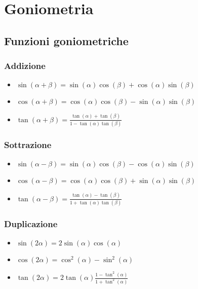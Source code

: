 
\section{Goniometria}

\subsection{Funzioni goniometriche}

\subsubsection*{Addizione}

\begin{itemize}
    \item $\sin(\alpha+\beta)=\sin(\alpha)\cos(\beta)+\cos(\alpha)\sin(\beta)$
    \item $\cos(\alpha+\beta)=\cos(\alpha)\cos(\beta)-\sin(\alpha)\sin(\beta)$
    \item $\tan(\alpha+\beta)=\frac{\tan(\alpha)+\tan(\beta)}{1-\tan(\alpha)\tan(\beta)}$
\end{itemize}

\subsubsection*{Sottrazione}

\begin{itemize}
    \item $\sin(\alpha-\beta)=\sin(\alpha)\cos(\beta)-\cos(\alpha)\sin(\beta)$
    \item $\cos(\alpha-\beta)=\cos(\alpha)\cos(\beta)+\sin(\alpha)\sin(\beta)$
    \item $\tan(\alpha-\beta)=\frac{\tan(\alpha)-\tan(\beta)}{1+\tan(\alpha)\tan(\beta)}$
\end{itemize}

\subsubsection*{Duplicazione}

\begin{itemize}
    \item $\sin(2\alpha)=2\sin(\alpha)\cos(\alpha)$
    \item $\cos(2\alpha)=\cos^2(\alpha)-\sin^2(\alpha)$
    \item $\tan(2\alpha)=2\tan(\alpha)\frac{1-\tan^2(\alpha)}{1+\tan^2(\alpha)}$
\end{itemize}

